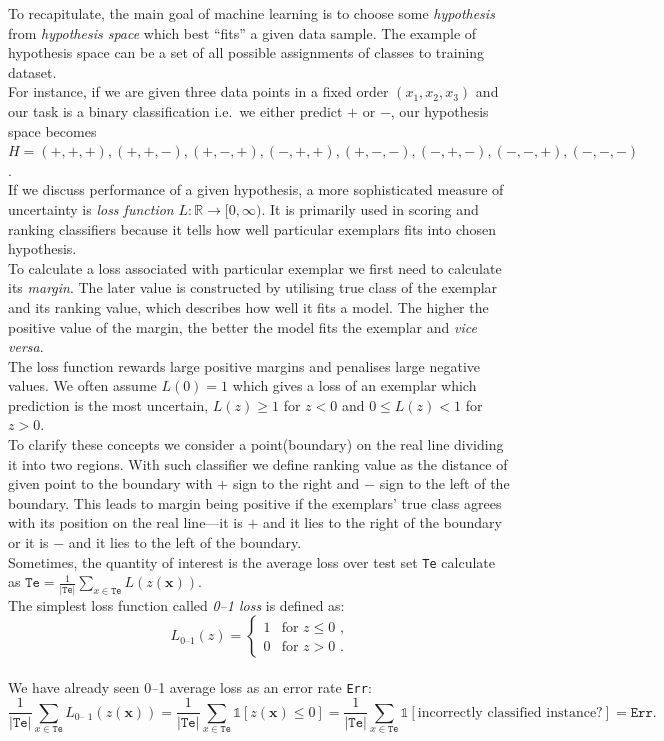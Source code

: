 \documentclass[12pt, a4paper, pdflatex, leqno, twoside]{report}
\begin{document}
To recapitulate, the main goal of machine learning is to choose some 
\emph{hypothesis} from \emph{hypothesis space} which best ``fits'' a given data 
sample. The example of hypothesis space can be a set of all 
possible assignments of classes to training dataset.\\
For instance, if we are given three data points in a fixed order $(x_1, x_2, 
x_3)$ and our task is a binary classification i.e.\ we either predict $+$ or $-$, 
our hypothesis space becomes $H = {(+, +, +), (+, +, -), (+, -, +), (-, +, +), 
(+, -, -), (-, +, -), (-, -, +), (-, -, -)}$.\\

If we discuss performance of a given hypothesis, a more sophisticated measure of 
uncertainty is \emph{loss function} $L : \mathbb{R} \rightarrow [0, \infty)$. 
It is primarily used in scoring and ranking 
classifiers because it tells how well particular exemplars fits into chosen hypothesis.\\
To calculate a loss associated with particular exemplar we first need to calculate its \emph{margin}. The later value is constructed by utilising true class of the exemplar and its ranking value, which describes how well it fits a model. The higher the positive value of the margin, the better the model fits the exemplar and \emph{vice versa}.\\
The loss function rewards large positive margins and penalises large negative 
values. We often assume $L(0) = 1$ which gives a loss of an exemplar which prediction is the most uncertain, $L(z) \geq 1$ for $z < 0$ and $0 \leq L(z) < 1$ for $z > 0$.\\
To clarify these concepts we consider a point(boundary) on the real line dividing it into two regions. With such classifier we define ranking value as the distance of given point to the boundary with $+$ sign to the right and $-$ sign to the left of the boundary. This leads to margin being positive if the exemplars' true class agrees with its position on the real line---it is $+$ and it lies to the right of the boundary or it is $-$ and it lies to the left of the boundary.\\

Sometimes, the quantity of interest is the average loss over test set \texttt{Te} 
calculate as $\mathtt{Te} = \frac{1}{|\mathtt{Te}|} \sum_{x \in \mathtt{Te}} 
L(z(\mathbf{x}))$.\\
The simplest loss function called \emph{0--1 loss} is defined as:
\[
 L_{\text{0--1}} (z) =
  \begin{cases}
   1 & \text{for } z \leq 0 \text{ ,} \\
   0 & \text{for } z > 0 \text{ .}
  \end{cases}
\]~\\
We have already seen 0--1 average loss as an error rate \texttt{Err}:
\[ \frac{1}{|\mathtt{Te}|} \sum_{x \in \mathtt{Te}} L_{\text{0--
1}}(z(\mathbf{x})) = 
   \frac{1}{|\mathtt{Te}|} \sum_{x \in \mathtt{Te}} \mathds{1} \left[ 
z(\mathbf{x}) \leq 0 \right] =
   \frac{1}{|\mathtt{Te}|} \sum_{x \in \mathtt{Te}} \mathds{1} \left[ 
\text{incorrectly classified instance?} \right] =
   \mathtt{Err}\text{.}
\]~\\
\end{document}
